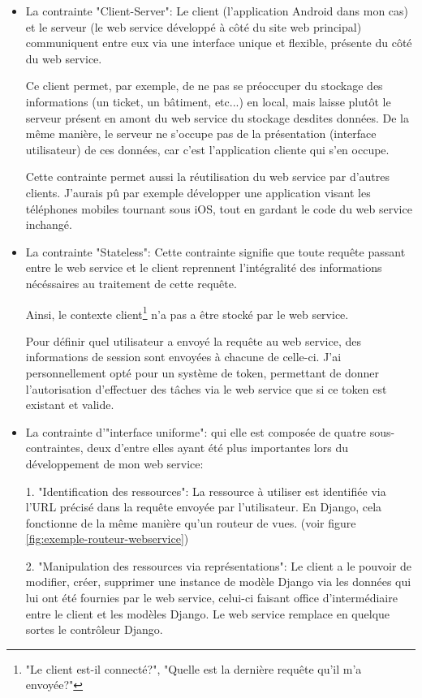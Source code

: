 \documentclass[12pt,table,a4paper]{report}
\begin{document}
\begin{itemize}
	\item{La contrainte "Client-Server": Le client (l'application Android dans mon cas) et le serveur (le web service développé à côté du site web principal) communiquent entre eux via une interface unique et flexible, présente du côté du web service.
	
	Ce client permet, par exemple, de ne pas se préoccuper du stockage des informations (un ticket, un bâtiment, etc...) en local, mais laisse plutôt le serveur présent en amont du web service du stockage desdites données. De la même manière, le serveur ne s'occupe pas de la présentation (interface utilisateur) de ces données, car c'est l'application cliente qui s'en occupe.
	
	Cette contrainte permet aussi la réutilisation du web service par d'autres clients. J'aurais pû par exemple développer une application visant les téléphones mobiles tournant sous iOS, tout en gardant le code du web service inchangé.}
	\item{La contrainte "Stateless": Cette contrainte signifie que toute requête passant entre le web service et le client reprennent l'intégralité des informations nécéssaires au traitement de cette requête.
	
	Ainsi, le contexte client\footnote{"Le client est-il connecté?", "Quelle est la dernière requête qu'il m'a envoyée?" } n'a pas a être stocké par le web service.
	
	Pour définir quel utilisateur a envoyé la requête au web service, des informations de session sont envoyées à chacune de celle-ci. J'ai personnellement opté pour un système de token, permettant de donner l'autorisation d'effectuer des tâches via le web service que si ce token est existant et valide.}
	\item{La contrainte d'"interface uniforme": qui elle est composée de quatre sous-contraintes, deux d'entre elles ayant été plus importantes lors du développement de mon web service:
			
			1. "Identification des ressources": La ressource à utiliser est identifiée via l'URL précisé dans la requête envoyée par l'utilisateur. En Django, cela fonctionne de la même manière qu'un routeur de vues. (voir figure \ref{fig:exemple-routeur-webservice})
			
			2. "Manipulation des ressources via représentations": Le client a le pouvoir de modifier, créer, supprimer une instance de modèle Django via les données qui lui ont été fournies par le web service, celui-ci faisant office d'intermédiaire entre le client et les modèles Django. Le web service remplace en quelque sortes le contrôleur Django.}
\end{itemize}
\end{document}
